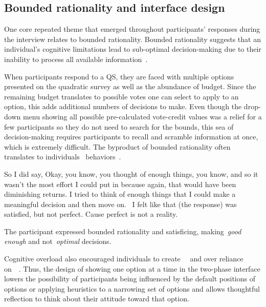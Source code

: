 \subsection{Bounded rationality and interface design}
One core repeated theme that emerged throughout participants' responses during the interview relates to bounded rationality. Bounded rationality suggests that an individual's cognitive limitations lead to sub-optimal decision-making due to their inability to process all available information~\cite{simonBehavioralModelRational1955}.

When participants respond to a QS, they are faced with multiple options presented on the quadratic survey as well as the abundance of budget. Since the remaining budget translates to possible votes one can select to apply to an option, this adds additional numbers of decisions to make. Even though the drop-down menu showing all possible pre-calculated vote-credit values was a relief for a few participants so they do not need to search for the bounds, this sea of decision-making requires participants to recall and scramble information at once, which is extremely difficult. The byproduct of bounded rationality often translates to individuals~\underline{} behaviors~\cite{gigerenzerReasoningFastFrugal1996}.

\begin{displayquote}
So I did say, Okay, you know, you thought of enough things, you know, and so it wasn't the most effort I could put in because again, that would have been diminishing returns. I tried to think of enough things that I could make a meaningful decision and then move on.~\bracketellipsis 
I felt like that (the response) was satisfied, but not perfect. Cause perfect is not a reality. \hfill{}
\end{displayquote}

The participant expressed bounded rationality and satisficing, making~\textit{good enough} and not~\textit{optimal} decisions.

Cognitive overload also encouraged individuals to create~\underline{}~\cite{tverskyJudgmentUncertaintyHeuristics1974} and over reliance on~\underline{}~\cite{thalerNudgeImprovingDecisions2008a}. Thus, the design of showing one option at a time in the two-phase interface lowers the possibility of participants being influenced by the default positions of options or applying heuristics to a narrowing set of options and allows thoughtful reflection to think about their attitude toward that option.

